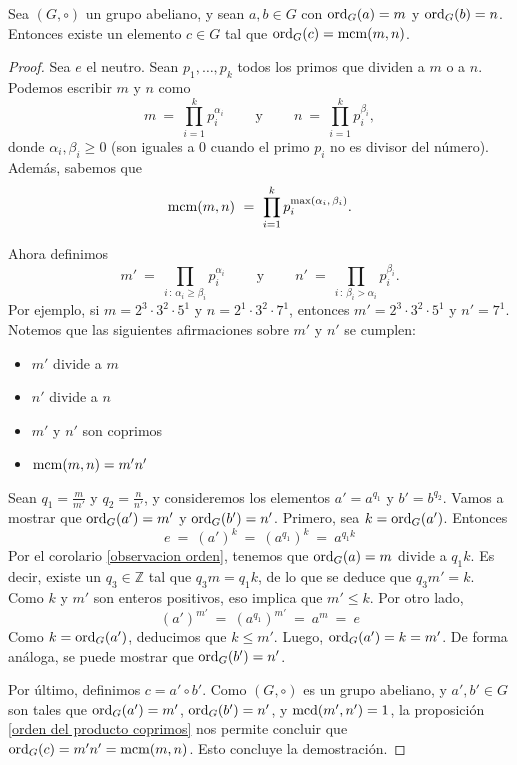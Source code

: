 \begin{corollary}\label{corolario orden}
Sea $(G,\circ)$ un grupo abeliano, y sean $a,b\in G$ con $\mathrm{ord}_{G}(a)=m$ y $\mathrm{ord}_{G}(b)=n$. Entonces existe un elemento $c\in G$ tal que $\mathrm{ord}_{G}(c)={\rm mcm}(m,n)$.
\end{corollary}
\begin{proof}
Sea $e$ el neutro. Sean $p_1,\dots,p_k$ todos los primos que dividen a $m$ o a $n$. Podemos escribir $m$ y $n$ como 
$$m \ = \ \prod\limits_{i=1}^k p_i^{\alpha_i} \ \qquad\text{y}\qquad \ n \ = \ \prod\limits_{i=1}^k p_i^{\beta_i},$$ donde $\alpha_i,\beta_i \geq 0$ (son iguales a 0 cuando el primo $p_i$ no es divisor del número). Además, sabemos que
$${\rm mcm}(m, n) \ = \ \prod\limits_{i=1}^k p_i^{\max(\alpha_i,\, \beta_i)}.$$

Ahora definimos
$$m' \ = \ \prod\limits_{i\,:\,\alpha_i\geq \beta_i} p_i^{\alpha_i} \ \qquad\text{y}\qquad \ n' \ = \ \prod\limits_{i\,:\,\beta_i> \alpha_i} p_i^{\beta_i}.$$
Por ejemplo, si $m=2^3\cdot 3^2\cdot 5^1$ y $n=2^1\cdot 3^2\cdot 7^1$, entonces $m' = 2^3\cdot 3^2\cdot 5^1$ y $n' = 7^1$. Notemos que las siguientes afirmaciones sobre $m'$ y $n'$ se cumplen:
\begin{itemize}
	\item $m'$ divide a $m$
	\item $n'$ divide a $n$
	\item $m'$ y $n'$ son coprimos
	\item ${\rm mcm}(m,n) = m'n'$
\end{itemize}
Sean $q_1 = \frac{m}{m'}$ y $q_2 = \frac{n}{n'}$, y consideremos los elementos $a' = a^{q_1}$ y $b' = b^{q_2}$. Vamos a mostrar que $\mathrm{ord}_{G}(a')=m'$ y $\mathrm{ord}_{G}(b')=n'$. Primero, sea $k=\mathrm{ord}_{G}(a')$. Entonces $$e\ = \ (a')^k\ = \ (a^{q_1})^k \ = \ a^{q_1k}$$
Por el corolario \ref{observacion orden}, tenemos que $\mathrm{ord}_{G}(a) = m$ divide a $q_1k$. Es decir, existe un $q_3 \in \mathbb{Z}$ tal que $q_3 m = q_1k$, de lo que se deduce que $q_3 m' = k$. Como $k$ y $m'$ son enteros positivos, eso implica que $m' \leq k$. Por otro lado, $$(a')^{m'} \ = \ (a^{q_1})^{m'} \ = \ a^m \ = \ e$$ 
Como $k=\mathrm{ord}_{G}(a')$, deducimos que $k\leq m'$. Luego, $\mathrm{ord}_{G}(a')=k=m'$. De forma análoga, se puede mostrar que $\mathrm{ord}_{G}(b')=n'$.


Por último, definimos $c=a'\circ b'$. Como $(G,\circ)$ es un grupo abeliano, y $a',b'\in G$ son tales que $\mathrm{ord}_{G}(a') = m'$, $\mathrm{ord}_{G}(b')= n'$, y ${\rm mcd}(m', n') = 1$, la proposición \ref{orden del producto coprimos} nos permite concluir que $\mathrm{ord}_{G}(c) = m'n' = {\rm mcm}(m,n)$. Esto concluye la demostración.
\end{proof}

